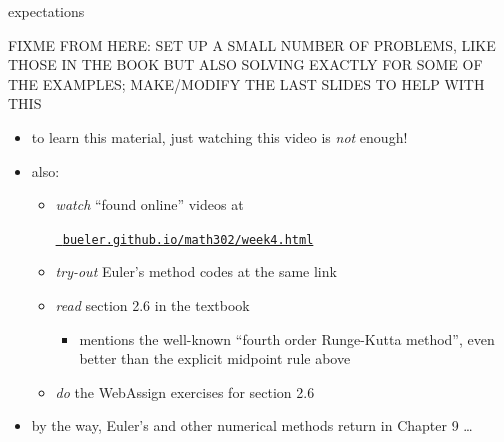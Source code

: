 \documentclass{beamer}
\begin{document}
\begin{frame}{expectations}

FIXME FROM HERE: SET UP A SMALL NUMBER OF PROBLEMS, LIKE THOSE IN THE BOOK BUT ALSO SOLVING EXACTLY FOR SOME OF THE EXAMPLES; MAKE/MODIFY THE LAST SLIDES TO HELP WITH THIS

\begin{itemize}
\item to learn this material, just watching this video is \emph{not} enough!

\item also:
     \begin{itemize}
     \item \emph{watch} ``found online'' videos at

     \centerline{\href{https://bueler.github.io/math302/week4.html}{\tt \color{cyan} bueler.github.io/math302/week4.html}}
     \item \emph{try-out} Euler's method codes at the same link
     \item \emph{read} section 2.6 in the textbook
         \begin{itemize}
         \item mentions the well-known ``fourth order Runge-Kutta method'', even better than the explicit midpoint rule above
         \end{itemize}
     \item \emph{do} the WebAssign exercises for section 2.6
     \end{itemize}

\bigskip
\item by the way, Euler's and other numerical methods return in Chapter 9 \dots
\end{itemize}
\end{frame}


\end{document}
